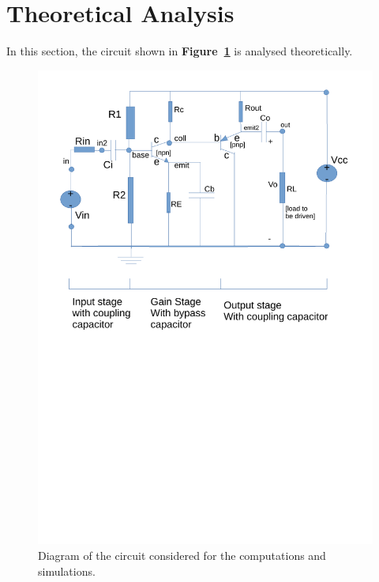 \section{Theoretical Analysis}
\label{sec:analysis}

In this section, the circuit shown in \textbf{Figure~\ref{fig:diagram_t4}} is analysed
theoretically.
\begin{figure}[h] \centering
\includegraphics[width=0.95\linewidth]{diagram_t4.pdf}
\vspace{-7cm}
\caption{Diagram of the circuit considered for the computations and simulations.}
\label{fig:diagram_t4}
\end{figure}



